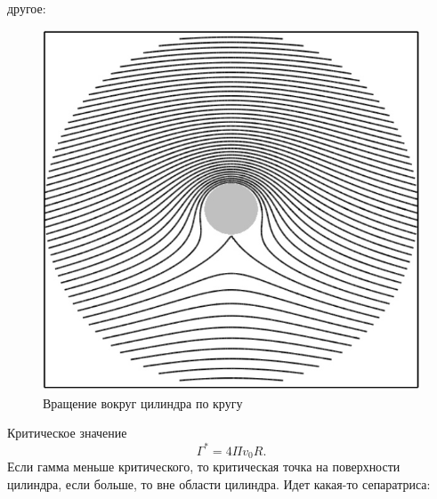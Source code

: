 другое:
\begin{figure}[H]
    \centering
    \includegraphics[scale=0.5]{photo/obtekaniecilindra3}
    \caption{Вращение вокруг цилиндра по кругу}
    \label{fig:figure1}
\end{figure}

Критическое значение
\begin{equation}
	\Gamma^*=4\Pi v_0 R.
\end{equation}
Если гамма меньше критического, то критическая точка на поверхности цилиндра, если больше, то вне области цилиндра. Идет какая-то сепаратриса:
